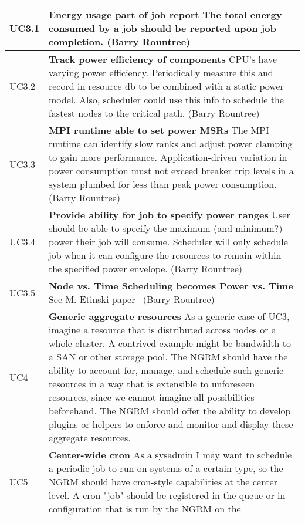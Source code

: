 \begin{longtable}{|p{1cm}|p{15cm}|}
  \hline
  UC3.1	& \textbf{Energy usage part of job report}\newline
	The total energy consumed by a job should be reported upon job
	completion. (Barry Rountree)\\
  \hline
  UC3.2	& \textbf{Track power efficiency of components}\newline
	CPU's have varying power efficiency. Periodically measure this and
	record in resource db to be combined with a static power model.
	Also, scheduler could use this info to schedule the fastest nodes
	to the critical path. (Barry Rountree)\\
  \hline
  UC3.3	& \textbf{MPI runtime able to set power MSRs}\newline
	The MPI runtime can identify slow ranks and adjust power clamping
	to gain more performance. Application-driven variation in power
	consumption must not exceed breaker trip levels in a system plumbed
	for less than peak power consumption. (Barry Rountree)\\
  \hline
  UC3.4	& \textbf{Provide ability for job to specify power ranges}\newline
	User should be able to specify the maximum (and minimum?) power their
	job will consume.  Scheduler will only schedule job when it can
	configure the resources to remain within the specified power envelope.
	(Barry Rountree)\\
  \hline
  UC3.5	& \textbf{Node vs. Time Scheduling becomes Power vs. Time}\newline
	See M. Etinski paper~\cite{PowerOpt} (Barry Rountree)\\
  \hline
  UC4 & \textbf{Generic aggregate resources}\newline
	As a generic case of UC3, imagine a resource that is distributed
	across nodes or a whole cluster. A contrived example might be
	bandwidth to a SAN or other storage pool. The NGRM should have the
	ability to account for, manage, and schedule such generic resources
	in a way that is extensible to unforeseen resources, since we cannot
	imagine all possibilities beforehand. The NGRM should offer the
	ability to develop plugins or helpers to enforce and monitor and
	display these aggregate resources.\\
  \hline
  UC5 & \textbf{Center-wide cron}\newline
	As a sysadmin I may want to schedule a periodic job to run on
	systems of a certain type, so the NGRM should have cron-style
	capabilities at the center level. A cron "job" should be registered
	in the queue or in configuration that is run by the NGRM on the

\end{longtable}
